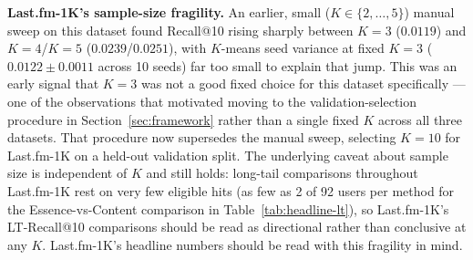 \documentclass[11pt,a4paper]{article}
\begin{document}
\textbf{Last.fm-1K's sample-size fragility.} An earlier, small ($K\in\{2,\ldots,5\}$)
manual sweep on this dataset found Recall@10 rising sharply between
$K=3$ ($0.0119$) and $K=4$/$K=5$ ($0.0239$/$0.0251$), with $K$-means seed
variance at fixed $K=3$ ($0.0122\pm0.0011$ across 10 seeds) far too small
to explain that jump. This was an early signal that $K=3$ was not a good
fixed choice for this dataset specifically --- one of the observations
that motivated moving to the validation-selection procedure in
Section~\ref{sec:framework} rather than a single fixed $K$ across all
three datasets. That procedure now supersedes the manual sweep,
selecting $K=10$ for Last.fm-1K on a held-out validation split. The
underlying caveat about sample size is independent of $K$ and still
holds: long-tail comparisons throughout Last.fm-1K rest on very few
eligible hits (as few as 2 of 92 users per method for the
Essence-vs-Content comparison in Table~\ref{tab:headline-lt}), so
Last.fm-1K's LT-Recall@10 comparisons should be read as directional
rather than conclusive at any $K$.
Last.fm-1K's headline numbers should be read with this fragility in mind.
\end{document}
